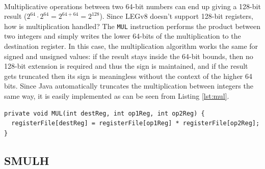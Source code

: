 \paragraph{}
Multiplicative operations between two 64-bit numbers can end up giving a 128-bit result ($2^{64}\cdot2^{64}=2^{64+64}=2^{128}$). Since LEGv8 doesn't support 128-bit registers, how is multiplication handled? The \verb|MUL| instruction performs the product between two integers and simply writes the lower 64-bits of the multiplication to the destination register. In this case, the multiplication algorithm works the same for signed and unsigned values: if the result stays inside the 64-bit bounds, then no 128-bit extension is required and thus the sign is maintained, and if the result gets truncated then its sign is meaningless without the context of the higher 64 bits. Since Java automatically truncates the multiplication between integers the same way, it is easily implemented as can be seen from Listing \ref{lst:mul}.
\begin{lstlisting}[float, caption={Implementation of the MUL instruction}, label={lst:mul}]
private void MUL(int destReg, int op1Reg, int op2Reg) {
  registerFile[destReg] = registerFile[op1Reg] * registerFile[op2Reg];
}
\end{lstlisting}
\subsection{SMULH}
